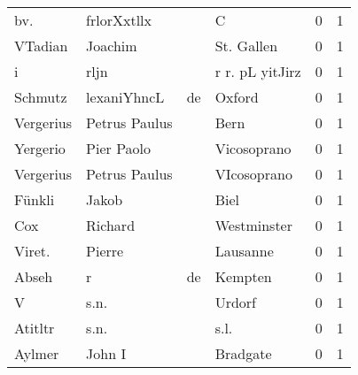 \begin{tabular}{llllrr}
                      bv. &                        frlorXxtllx &             &                                           C &          0 &         1 \\
                  VTadian &                            Joachim &             &                                  St. Gallen &          0 &         1 \\
                        i &                               rljn &             &                             r r. pL yitJirz &          0 &         1 \\
                  Schmutz &                        lexaniYhncL &          de &                                      Oxford &          0 &         1 \\
                Vergerius &                      Petrus Paulus &             &                                        Bern &          0 &         1 \\
                 Yergerio &                         Pier Paolo &             &                                 Vicosoprano &          0 &         1 \\
                Vergerius &                      Petrus Paulus &             &                                 VIcosoprano &          0 &         1 \\
                   Fünkli &                              Jakob &             &                                        Biel &          0 &         1 \\
                      Cox &                            Richard &             &                                 Westminster &          0 &         1 \\
                   Viret. &                             Pierre &             &                                    Lausanne &          0 &         1 \\
                    Abseh &                                  r &          de &                                     Kempten &          0 &         1 \\
                        V &                               s.n. &             &                                      Urdorf &          0 &         1 \\
                  Atitltr &                               s.n. &             &                                        s.l. &          0 &         1 \\
                   Aylmer &                             John I &             &                                    Bradgate &          0 &         1 \\

\end{tabular}
